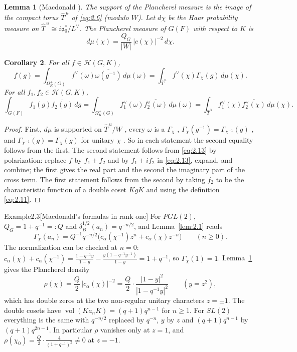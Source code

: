 \documentclass[12pt,letterpaper]{article}
\numberwithin{equation}{section}
\theoremstyle{plain}
\newtheorem{lemma}{Lemma}[section]
\newtheorem{corollary}[lemma]{Corollary}
\theoremstyle{remark}
\theoremstyle{plain}
\theoremstyle{definition}
\theoremstyle{remark}
\theoremstyle{remark}
\newcommand{\Hc}{\mathcal{H}}
\newcommand{\fa}{\mathfrak{a}}
\newcommand{\Thu}{\widehat{T}^{\,u}}
\DeclareMathOperator{\vol}{vol}
\begin{document}
\begin{lemma}[Macdonald {\cite[Thm.~5.1.2]{Ma71}}]\label{lem:2.2}
The support of the Plancherel measure is the image of the compact torus $\Thu$ of \eqref{eq:2.6} (modulo $W$). Let $d\chi$ be the Haar probability measure on $\Thu\cong i\fa_0^*/L^\vee$. The Plancherel measure of $G(F)$ with respect to $K$ is
\[
d\mu(\chi)=\frac{Q_G}{|W|}\,|c(\chi)|^{-2}\,d\chi.
\]
\end{lemma}

\begin{corollary}\label{cor:2.3}
For all $f\in\Hc(G,K)$,
\[
f(g)=\int_{\Omega^+_K(G)}f^\vee(\omega)\overline{\omega(g^{-1})}\,d\mu(\omega)=\int_{\Thu}f^\vee(\chi)\Gamma_\chi(g)\,d\mu(\chi).
\]
For all $f_1,f_2\in\Hc(G,K)$,
\[
\int_{G(F)}f_1(g)\overline{f_2(g)}\,dg=\int_{\Omega^+_K(G)}f_1^\vee(\omega)\overline{f_2^\vee(\omega)}\,d\mu(\omega)=\int_{\Thu}f_1^\vee(\chi)\overline{f_2^\vee(\chi)}\,d\mu(\chi).
\]
\end{corollary}

\begin{proof}
First, $d\mu$ is supported on $\Thu/W$ \cite[Thm.~5.1.2]{Ma71}, every $\omega$ is a $\Gamma_\chi$ \cite[Thm.~3.3.12]{Ma71}, $\Gamma_\chi(g^{-1})=\Gamma_{\chi^{-1}}(g)$ \cite[Prop.~3.3.2]{Ma71}, and $\overline{\Gamma_{\chi^{-1}}(g)}=\Gamma_\chi(g)$ for unitary $\chi$ \cite[p.~150]{Ca79}. So in each statement the second equality follows from the first. The second statement follows from \eqref{eq:2.13} by polarization: replace $f$ by $f_1+f_2$ and by $f_1+if_2$ in \eqref{eq:2.13}, expand, and combine; the first gives the real part and the second the imaginary part of the cross term. The first statement follows from the second by taking $f_2$ to be the characteristic function of a double coset $KgK$ and using the definition \eqref{eq:2.11}.
\end{proof}

\begin{fixedrem}{Example}{2.3}[Macdonald's formulas in rank one]\label{ex:2.3}
For $PGL(2)$, $Q_G=1+q^{-1}=:Q$ and $\delta_B^{1/2}(a_n)=q^{-n/2}$, and Lemma~\ref{lem:2.1} reads
\[
\Gamma_\chi(a_n)=Q^{-1}q^{-n/2}\big(c_\alpha(\chi^{-1})z^n+c_\alpha(\chi)z^{-n}\big)\qquad(n\ge0).
\]
The normalization can be checked at $n=0$: $c_\alpha(\chi)+c_\alpha(\chi^{-1})=\frac{1-q^{-1}y}{1-y}-\frac{y(1-q^{-1}y^{-1})}{1-y}=1+q^{-1}$, so $\Gamma_\chi(1)=1$. Lemma~\ref{lem:2.2} gives the Plancherel density
\[
\rho(\chi)=\frac Q2\,|c_\alpha(\chi)|^{-2}=\frac Q2\cdot\frac{|1-y|^2}{|1-q^{-1}y|^2}\qquad(y=z^2),
\]
which has double zeros at the two non-regular unitary characters $z=\pm1$. The double cosets have $\vol(Ka_nK)=(q+1)q^{n-1}$ for $n\ge1$. For $SL(2)$ everything is the same with $q^{-n/2}$ replaced by $q^{-n}$, $y$ by $z$ and $(q+1)q^{n-1}$ by $(q+1)q^{2n-1}$. In particular $\rho$ vanishes only at $z=1$, and $\rho(\chi_0)=\frac Q2\cdot\frac4{(1+q^{-1})^2}\ne0$ at $z=-1$.
\end{fixedrem}
\end{document}

